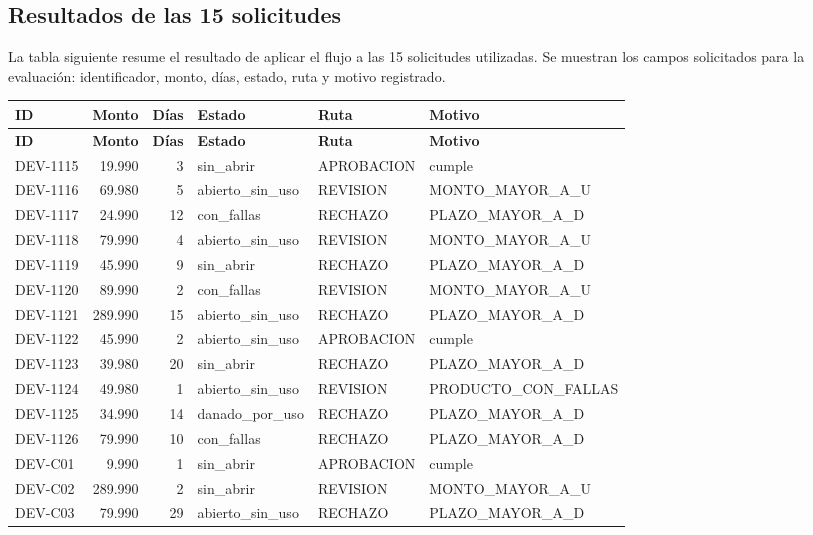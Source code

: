 \documentclass[11pt,a4paper]{article}
\begin{document}
\subsection{Resultados de las 15 solicitudes}

La tabla siguiente resume el resultado de aplicar el flujo a las 15 solicitudes utilizadas. Se muestran los campos solicitados para la evaluación: identificador, monto, días, estado, ruta y motivo registrado.

\scriptsize
\begin{longtable}{@{}p{1.65cm}r r p{2.65cm}p{1.75cm}p{3.45cm}@{}}
\toprule
\textbf{ID} & \textbf{Monto} & \textbf{Días} & \textbf{Estado} & \textbf{Ruta} & \textbf{Motivo} \\
\midrule
\endfirsthead
\toprule
\textbf{ID} & \textbf{Monto} & \textbf{Días} & \textbf{Estado} & \textbf{Ruta} & \textbf{Motivo} \\
\midrule
\endhead
DEV-1115 & 19.990 & 3 & sin\_abrir & APROBACION & cumple \\
DEV-1116 & 69.980 & 5 & abierto\_sin\_uso & REVISION & MONTO\_MAYOR\_A\_U \\
DEV-1117 & 24.990 & 12 & con\_fallas & RECHAZO & PLAZO\_MAYOR\_A\_D \\
DEV-1118 & 79.990 & 4 & abierto\_sin\_uso & REVISION & MONTO\_MAYOR\_A\_U \\
DEV-1119 & 45.990 & 9 & sin\_abrir & RECHAZO & PLAZO\_MAYOR\_A\_D \\
DEV-1120 & 89.990 & 2 & con\_fallas & REVISION & MONTO\_MAYOR\_A\_U \\
DEV-1121 & 289.990 & 15 & abierto\_sin\_uso & RECHAZO & PLAZO\_MAYOR\_A\_D \\
DEV-1122 & 45.990 & 2 & abierto\_sin\_uso & APROBACION & cumple \\
DEV-1123 & 39.980 & 20 & sin\_abrir & RECHAZO & PLAZO\_MAYOR\_A\_D \\
DEV-1124 & 49.980 & 1 & abierto\_sin\_uso & REVISION & PRODUCTO\_CON\_FALLAS \\
DEV-1125 & 34.990 & 14 & danado\_por\_uso & RECHAZO & PLAZO\_MAYOR\_A\_D \\
DEV-1126 & 79.990 & 10 & con\_fallas & RECHAZO & PLAZO\_MAYOR\_A\_D \\
DEV-C01 & 9.990 & 1 & sin\_abrir & APROBACION & cumple \\
DEV-C02 & 289.990 & 2 & sin\_abrir & REVISION & MONTO\_MAYOR\_A\_U \\
DEV-C03 & 79.990 & 29 & abierto\_sin\_uso & RECHAZO & PLAZO\_MAYOR\_A\_D \\
\bottomrule
\end{longtable}
\normalsize
\end{document}
